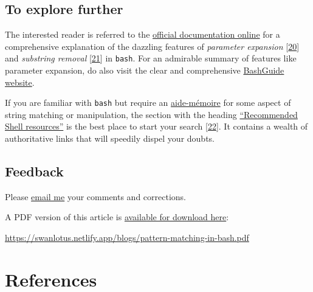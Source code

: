 \documentclass[
  a4paper,
]{article}
\begin{document}
\hypertarget{to-explore-further}{%
\subsection{To explore further}\label{to-explore-further}}

The interested reader is referred to the
\href{https://www.gnu.org/savannah-checkouts/gnu/bash/manual/bash.html\#Shell-Parameter-Expansion}{official
documentation online} for a comprehensive explanation of the dazzling
features of \emph{parameter expansion}
{[}\protect\hyperlink{ref-shellparamexp}{20}{]} and \emph{substring
removal} {[}\protect\hyperlink{ref-wikisubstring}{21}{]} in
\texttt{bash}. For an admirable summary of features like parameter
expansion, do also visit the clear and comprehensive
\href{https://mywiki.wooledge.org/BashGuide/Parameters}{BashGuide
website}.

If you are familiar with \texttt{bash} but require an
\href{https://www.thefreedictionary.com/aide+memoire}{aide-mémoire} for
some aspect of string matching or manipulation, the section with the
heading
\href{https://wiki.bash-hackers.org/start\#recommended_shell_resources}{``Recommended
Shell resources''} is the best place to start your search
{[}\protect\hyperlink{ref-bhwstart}{22}{]}. It contains a wealth of
authoritative links that will speedily dispel your doubts.

\hypertarget{feedback}{%
\subsection{Feedback}\label{feedback}}

Please \href{mailto:feedback.swanlotus@gmail.com}{email me} your
comments and corrections.

\noindent A PDF version of this article is
\href{./pattern-matching-in-bash.pdf}{available for download here}:

\begin{small}

\begin{sffamily}

\url{https://swanlotus.netlify.app/blogs/pattern-matching-in-bash.pdf}

\end{sffamily}

\end{small}

\hypertarget{bibliography}{%
\section*{References}\label{bibliography}}
\end{document}

